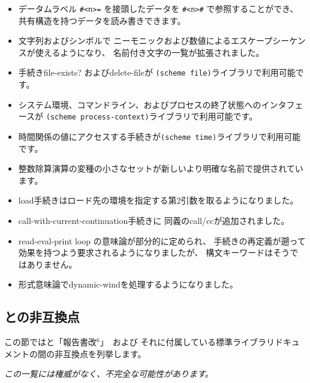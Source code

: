 \begin{itemize}
\item データムラベル {\tt \#<n>=} を接頭したデータを {\tt \#<n>\#} で参照することができ、
共有構造を持つデータを読み書きできます。

\item 文字列およびシンボルで
ニーモニックおよび数値によるエスケープシーケンスが使えるようになり、
名前付き文字の一覧が拡張されました。

\item 手続き{\cf file-exists?} および{\cf delete-file}が
{\tt (scheme file)}ライブラリで利用可能です。

\item システム環境、コマンドライン、およびプロセスの終了状態へのインタフェースが
{\tt (scheme process-\+context)}ライブラリで利用可能です。

\item 時間関係の値にアクセスする手続きが{\tt (scheme time)}ライブラリで利用可能です。

\item 整数除算演算の変種の小さなセットが新しいより明確な名前で提供されています。

\item {\cf load}手続きはロード先の環境を指定する第2引数を取るようになりました。

\item {\cf call-with-current-continuation}手続きに
同義の{\cf call/cc}が追加されました。

\item read-eval-print loop の意味論が部分的に定められ、
手続きの再定義が遡って効果を持つよう要求されるようになりましたが、
構文キーワードはそうではありません。

\item 形式意味論で{\cf dynamic-wind}を処理するようになりました。
\end{itemize}

\subsection*{\rsixrs{}との非互換点}
この節では\rsevenrs{}と「報告書改$^6$」~\cite{R6RS}および
それに付属している標準ライブラリドキュメントの間の非互換点を列挙します。

{\em この一覧には権威がなく、不完全な可能性があります。}

